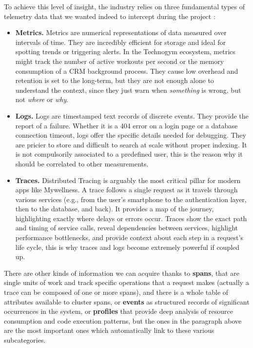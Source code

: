 \documentclass[12pt,a4paper,openright,twoside]{book}
\begin{document}
To achieve this level of insight, the industry relies on three fundamental types of telemetry data that we wanted indeed to intercept during the project \cite{observability}:
\begin{itemize}
    \item \textbf{Metrics.} Metrics are numerical representations of data measured over intervals of time. They are incredibly efficient for storage and ideal for spotting trends or triggering alerts. In the Technogym ecosystem, metrics might track the number of active workouts per second or the memory consumption of a \ac{CRM} background process. They cause low overhead and retention is set to the long-term, but they are not enough alone to understand the context, since they just warn when \textit{something} is wrong, but not \textit{where} or \textit{why}.
    \item \textbf{Logs.} Logs are timestamped text records of discrete events. They provide the report of a failure. Whether it is a 404 error on a login page or a database connection timeout, logs offer the specific details needed for debugging. They are pricier to store and difficult to search at scale without proper indexing. It is not compulsorily associated to a predefined user, this is the reason why it should be correlated to other measurements.  
    \item \textbf{Traces.} Distributed Tracing is arguably the most critical pillar for modern apps like Mywellness. A trace follows a single request as it travels through various services (e.g., from the user's smartphone to the authentication layer, then to the database, and back). It provides a map of the journey, highlighting exactly where delays or errors occur. Traces show the exact path and timing of service calls, reveal dependencies between services, highlight performance bottlenecks, and provide context about each step in a request's life cycle, this is why traces and logs become extremely powerful if coupled up. 
\end{itemize}

There are other kinds of information we can acquire thanks to \textbf{spans}, that are single units of work and track specific operations that a request makes (actually a trace can be composed of one or more spans), and there is a whole table of attributes available to cluster spans, or \textbf{events} as structured records of significant occurrences in the system, or \textbf{profiles} that provide deep analysis of resource consumption and code execution patterns, but the ones in the paragraph above are the most important ones which automatically link to these various subcategories.  
\end{document}
